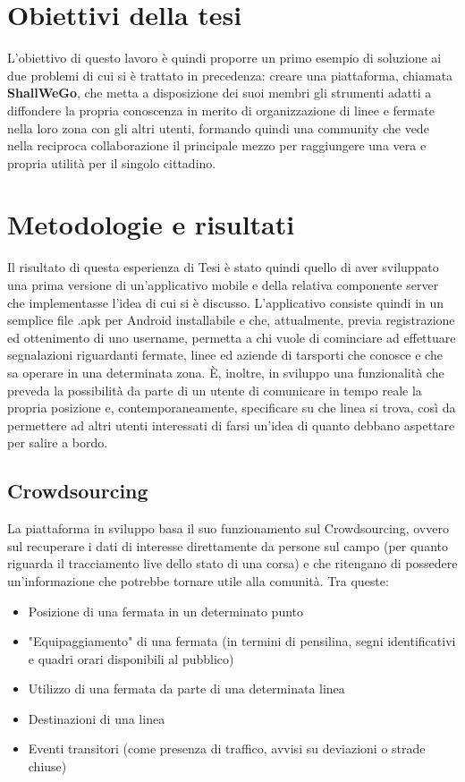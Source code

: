 \section{Obiettivi della tesi}
    L'obiettivo di questo lavoro è quindi proporre un primo esempio di soluzione ai due problemi di cui si è trattato in precedenza: creare una piattaforma, chiamata \textbf{ShallWeGo}, che metta a disposizione dei suoi membri gli strumenti adatti a diffondere la propria conoscenza in merito di organizzazione di linee e fermate nella loro zona con gli altri utenti, formando quindi una community che vede nella reciproca collaborazione il principale mezzo per raggiungere una vera e propria utilità per il singolo cittadino.

    
    
\section{Metodologie e risultati}
    Il risultato di questa esperienza di Tesi è stato quindi quello di aver sviluppato una prima versione di un'applicativo mobile e della relativa componente server che implementasse l'idea di cui si è discusso. L'applicativo consiste quindi in un semplice file .apk per Android installabile e che, attualmente, previa registrazione ed ottenimento di uno username, permetta a chi vuole di cominciare ad effettuare segnalazioni riguardanti fermate, linee ed aziende di tarsporti che conosce e che sa operare in una determinata zona.
    È, inoltre, in sviluppo una funzionalità che preveda la possibilità da parte di un utente di comunicare in tempo reale la propria posizione e, contemporaneamente, specificare su che linea si trova, così da permettere ad altri utenti interessati di farsi un'idea di quanto debbano aspettare per salire a bordo.
    \subsection{Crowdsourcing}
        La piattaforma in sviluppo basa il suo funzionamento sul Crowdsourcing, ovvero sul recuperare i dati di interesse direttamente da persone sul campo (per quanto riguarda il tracciamento live dello stato di una corsa) e che ritengano di possedere un'informazione che potrebbe tornare utile alla comunità. Tra queste:
        \begin{itemize}
            \item Posizione di una fermata in un determinato punto
            \item "Equipaggiamento" di una fermata (in termini di pensilina, segni identificativi e quadri orari disponibili al pubblico)
            \item Utilizzo di una fermata da parte di una determinata linea
            \item Destinazioni di una linea
            \item Eventi transitori (come presenza di traffico, avvisi su deviazioni o strade chiuse)
        \end{itemize}

